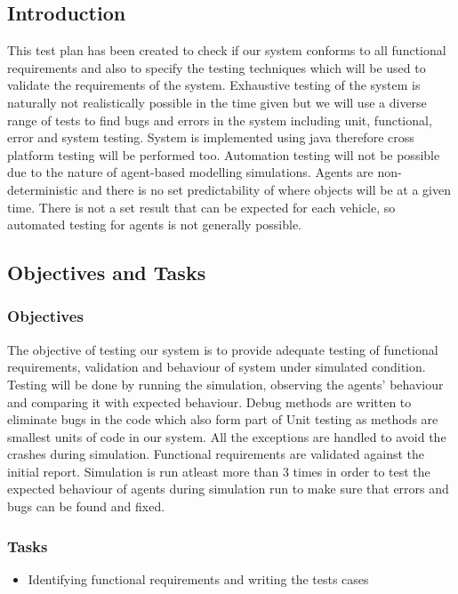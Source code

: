 \documentclass[11pt]{article}
\begin{document}
\begin{enumerate}
\subsection{Introduction}
This test plan has been created to check if our system conforms to all functional requirements and also to specify the testing techniques which will be used to validate the requirements of the system. Exhaustive testing of the system is naturally not realistically possible in the time given but we will use a diverse range of tests to find bugs and errors in the system including unit, functional, error and system testing. System is implemented using java therefore cross platform testing will be performed too. Automation testing will not be possible due to the nature of agent-based modelling simulations. Agents are non-deterministic and there is no set predictability of where objects will be at a given time. There is not a set result that can be expected for each vehicle, so automated testing for agents is not generally possible.

\subsection{Objectives and Tasks}
\subsubsection{Objectives}
The objective of testing our system is to provide adequate testing of functional requirements, validation and behaviour of system under simulated condition. Testing will be done by running the simulation, observing the agents' behaviour and comparing it with expected behaviour. Debug methods are written to eliminate bugs in the code which also form part of Unit testing as methods are smallest units of code in our system. All the exceptions are handled to avoid the crashes during simulation. 
Functional requirements are validated against the initial report.
Simulation is run atleast more than 3 times in order to test the expected behaviour of agents during simulation run to make sure that errors and bugs can be found and fixed.

\subsubsection{Tasks}
\begin{itemize}
\item Identifying functional requirements and writing the tests cases


\end{itemize}
\end{enumerate}
\end{document}
